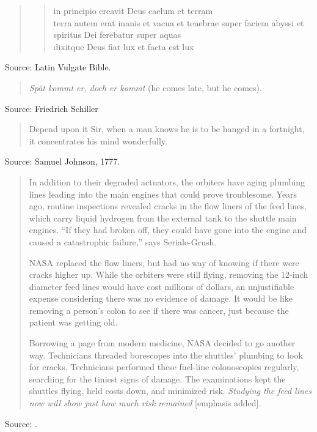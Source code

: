 \documentclass[a4paper]{article}
\begin{document}
\begin{quote}
	\begin{verse}
		in principio creavit Deus caelum et terram \\

		terra autem erat inanis et vacua et tenebrae super faciem abyssi et spiritus Dei
		ferebatur super aquas \\

		dixitque Deus fiat lux et facta est lux \\
	\end{verse}
\end{quote}
Source: Latin Vulgate Bible.
\medskip

\begin{quote}
	\emph{Sp\"{a}t kommt er, doch er kommt} (he comes late, but he comes).
\end{quote}
Source: Friedrich Schiller
\medskip

\begin{quote}
	Depend upon it Sir, when a man knows he is to be hanged in a fortnight, it concentrates his
mind wonderfully.
\end{quote}
Source: Samuel Johnson, 1777.
\medskip

\begin{quote}
	In addition to their degraded actuators, the orbiters have aging plumbing lines leading into
the main engines that could prove troublesome.  Years ago, routine inspections revealed cracks in
the flow liners of the feed lines, which carry liquid hydrogen from the external tank to the
shuttle main engines.  ``If they had broken off, they could have gone into the engine and caused a
catastrophic failure,'' says Seriale-Grush.

NASA replaced the flow liners, but had no way of knowing if there were cracks higher up.  While the
orbiters were still flying, removing the 12-inch diameter feed lines would have cost millions of
dollars, an unjustifiable expense considering there was no evidence of damage.  It would be like
removing a person's colon to see if there was cancer, just because the patient was getting old.

Borrowing a page from modern medicine, NASA decided to go another way.  Technicians threaded
borescopes into the shuttles' plumbing to look for cracks.  Technicians performed these fuel-line
colonoscopies regularly, searching for the tiniest signs of damage.  The examinations kept the
shuttles flying, held costs down, and minimized risk.  \emph{Studying the feed lines now will show
just how much risk remained} [emphasis added].
\end{quote}
Source: \citet[p.~28--29]{Freiherr2012}.
\medskip
\end{document}
